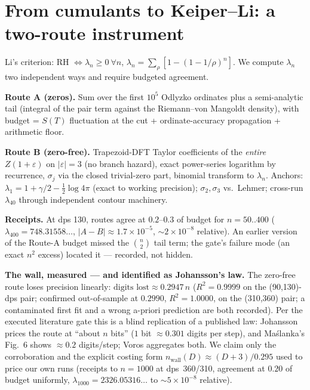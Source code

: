 \documentclass[11pt]{article}
\newcommand{\eps}{\varepsilon}
\begin{document}
\section{From cumulants to Keiper--Li: a two-route instrument}
Li's criterion: RH $\iff \lambda_n\ge0\ \forall n$, $\lambda_n=\sum_\rho[1-(1-1/\rho)^n]$.
We compute $\lambda_n$ two independent ways and require budgeted agreement.

\textbf{Route A (zeros).} Sum over the first $10^5$ Odlyzko ordinates plus a semi-analytic tail
(integral of the pair term against the Riemann--von Mangoldt density), with budget = $S(T)$
fluctuation at the cut + ordinate-accuracy propagation + arithmetic floor.

\textbf{Route B (zero-free).} Trapezoid-DFT Taylor coefficients of the \emph{entire} $Z(1+\eps)$ on
$|\eps|=3$ (no branch hazard), exact power-series logarithm by recurrence, $\sigma_j$ via the closed
trivial-zero part, binomial transform to $\lambda_n$. Anchors: $\lambda_1=1+\gamma/2-\tfrac12\log4\pi$
(exact to working precision); $\sigma_2,\sigma_3$ vs.\ Lehmer; cross-run $\lambda_{40}$ through
independent contour machinery.

\textbf{Receipts.} At dps 130, routes agree at $0.2$--$0.3$ of budget for $n=50..400$
($\lambda_{400}=748.31558\ldots$, $|A-B|\approx1.7\times10^{-5}$, $\sim2\times10^{-8}$ relative).
An earlier version of the Route-A budget missed the $\binom{n}{2}$ tail term; the gate's failure
mode (an exact $n^2$ excess) located it --- recorded, not hidden.

\textbf{The wall, measured --- and identified as Johansson's law.} The zero-free route loses
precision linearly: $\text{digits lost}\approx 0.2947\,n$ ($R^2=0.9999$ on the (90,130)-dps pair;
confirmed out-of-sample at $0.2990$, $R^2=1.0000$, on the (310,360) pair; a contaminated first fit
and a wrong a-priori prediction are both recorded). Per the executed literature gate this is a blind
replication of a published law: Johansson prices the route at ``about $n$ bits'' ($1$ bit
$\approx0.301$ digits per step), and Ma\'slanka's Fig.~6 shows $\approx0.2$ digits/step; Voros
aggregates both. We claim only the corroboration and the explicit costing form
$n_{\mathrm{wall}}(D)\approx(D+3)/0.295$ used to price our own runs (receipts to $n=1000$ at
dps~360/310, agreement at $0.20$ of budget uniformly, $\lambda_{1000}=2326.05316\ldots$ to
$\sim5\times10^{-8}$ relative).
\end{document}
